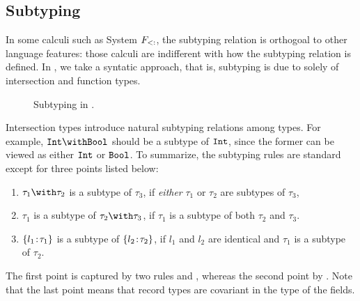 \subsection{Subtyping}




In some calculi such as System $ F_{<:} $, the subtyping relation is
orthogoal to other language features: those calculi are indifferent with how the
subtyping relation is defined. In \name, we take a syntatic approach, that is,
subtyping is due to solely of intersection and function types.

\begin{figure*}

\caption{Subtyping in \name.}
\end{figure*}


Intersection types introduce natural subtyping relations among types. For
example, $ \Int \andop \Bool $ should be a subtype of $ \texttt{Int} $, since the
former can be viewed as either $ \texttt{Int} $ or $ \texttt{Bool} $. To summarize, the
subtyping rules are standard except for three points listed below:
\begin{enumerate}
\item $ \tau_1 \andop \tau_2 $ is a subtype of $ \tau_3 $, if \emph{either} $ \tau_1 $ or
  $ \tau_2 $ are subtypes of $ \tau_3 $,

\item $ \tau_1 $ is a subtype of $ \tau_2 \andop \tau_3 $, if $ \tau_1 $ is a subtype of
  both $ \tau_2 $ and $ \tau_3 $.

\item $ \{ l_1 \!:\! \tau_1 \} $ is a subtype of $ \{ l_2 \!:\! \tau_2 \} $, if
  $ l_1 $ and $ l_2 $ are identical and $ \tau_1 $ is a subtype of $ \tau_2 $.
\end{enumerate}
The first point is captured by two rules  and
, whereas the second point by . Note that the
last point means that record types are covariant in the type of the fields.


